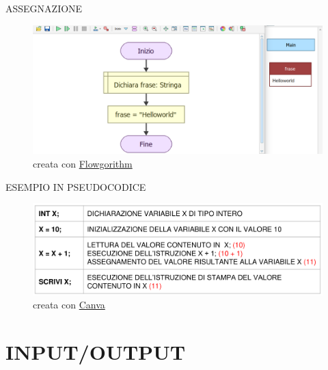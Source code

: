 \documentclass[aspectratio=1610, handout]{beamer}
\begin{document}
\begin{frame}{ASSEGNAZIONE}
    \begin{figure}
        \includegraphics[width=\linewidth]{img/assegnazione2.png}
        \caption{{creata con \href{http://www.flowgorithm.org/}{Flowgorithm}}}
    \end{figure}
\end{frame}

\begin{frame}{ESEMPIO IN PSEUDOCODICE}
    \begin{figure}
        \includegraphics[width=\linewidth]{img/pseudocodice.png}
        \caption{{creata con \href{www.canva.com}{Canva}}}
    \end{figure}
\end{frame}

\section{INPUT/OUTPUT}
\end{document}

